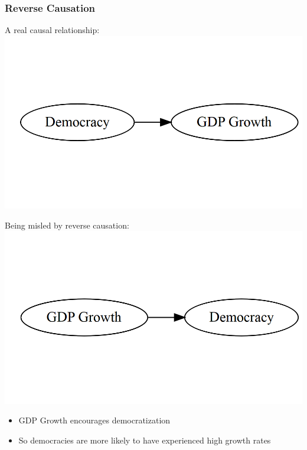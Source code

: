 \documentclass[xcolor=x11names,compress]{beamer}\usepackage[]{graphicx}\usepackage[]{color}
\makeatletter
\def\maxwidth{ %
  \ifdim\Gin@nat@width>\linewidth
    \linewidth
  \else
    \Gin@nat@width
  \fi
}
\newenvironment{knitrout}{}{} %
\renewcommand{\(}{\begin{columns}}
\renewcommand{\)}{\end{columns}}
\newcommand{\<}[1]{\begin{column}{#1}}
\renewcommand{\>}{\end{column}}
\makeatother
\begin{document}
\begin{frame}
\frametitle{Reverse Causation}
\begin{multicols}{2}
A real causal relationship:
\begin{knitrout}
\color{fgcolor}
\includegraphics[width=\maxwidth]{figure/reverse1-1} 

\end{knitrout}
\columnbreak
Being misled by reverse causation:
\begin{knitrout}
\color{fgcolor}
\includegraphics[width=\maxwidth]{figure/reverse2-1} 

\end{knitrout}
\end{multicols}
\begin{itemize}
\pause
\item GDP Growth encourages democratization
\pause
\item So democracies are more likely to have experienced high growth rates
\end{itemize}
\end{frame}
\end{document}
